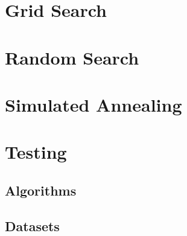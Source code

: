 \section{Grid Search}

\section{Random Search}

\section{Simulated Annealing}

\section{Testing}

\subsection{Algorithms}

\subsection{Datasets}